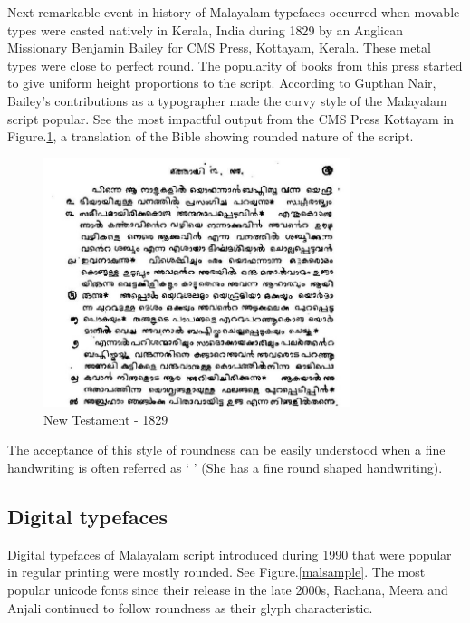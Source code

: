\documentclass[11pt,twoside,a4paper,parskip=full]{scrartcl}
\begin{document}
Next remarkable event in history of Malayalam typefaces occurred when movable types were casted natively in Kerala, India during 1829 by an Anglican Missionary Benjamin Bailey\cite{babucherian} for CMS Press, Kottayam, Kerala. These metal types were close to perfect round. The popularity of books from this press started to give uniform height proportions to the script. According to Gupthan Nair, Bailey's contributions as a typographer made the curvy style of the Malayalam script popular\cite{gupthannair}. See the most impactful output from the CMS Press Kottayam in Figure.\ref{newtestament}, a translation of the Bible showing rounded nature of the script.


\begin{figure}[h!]
	\includegraphics[width=0.8\textwidth]{images/newtestament1829.png}
	\caption{New Testament - 1829}
	\label{newtestament}
\end{figure}

The acceptance of this style of roundness can be easily understood when a fine handwriting is often referred as `{ }' (She has a fine round shaped handwriting).


\subsection{Digital typefaces}

Digital typefaces of Malayalam script introduced during 1990 that were popular in regular printing were mostly rounded. See Figure.\ref{malsample}. The most popular unicode fonts since their release in the late 2000s, Rachana, Meera and Anjali continued to follow roundness as their glyph characteristic.
\end{document}

